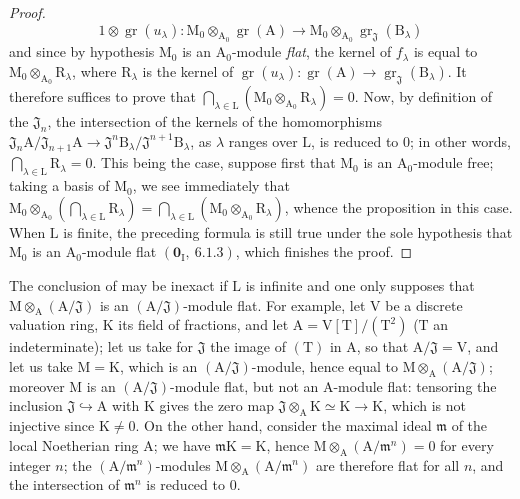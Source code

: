 \begin{proof}
\[
1\otimes\operatorname{gr}(u_\lambda) : \mathrm{M}_0\otimes_{\mathrm{A}_0}\operatorname{gr}(\mathrm{A}) \to \mathrm{M}_0\otimes_{\mathrm{A}_0}\operatorname{gr}_\mathfrak{J}(\mathrm{B}_\lambda)
\]
and since by hypothesis $\mathrm{M}_0$ is an $\mathrm{A}_0$-module \emph{flat}, the kernel of $f_\lambda$ is equal to $\mathrm{M}_0\otimes_{\mathrm{A}_0}\mathrm{R}_\lambda$,
where $\mathrm{R}_\lambda$ is the kernel of $\operatorname{gr}(u_\lambda):\operatorname{gr}(\mathrm{A})\to\operatorname{gr}_\mathfrak{J}(\mathrm{B}_\lambda)$. It therefore suffices to prove that
$\bigcap_{\lambda\in\mathrm{L}}(\mathrm{M}_0\otimes_{\mathrm{A}_0}\mathrm{R}_\lambda)=0$. Now, by definition of the $\mathfrak{J}_n$, the intersection of the kernels of the homomorphisms
$\mathfrak{J}_n\mathrm{A}/\mathfrak{J}_{n+1}\mathrm{A}\to\mathfrak{J}^n\mathrm{B}_\lambda/\mathfrak{J}^{n+1}\mathrm{B}_\lambda$, as $\lambda$ ranges over $\mathrm{L}$, is reduced to $0$; in other
words, $\bigcap_{\lambda\in\mathrm{L}}\mathrm{R}_\lambda=0$. This being the case, suppose first that $\mathrm{M}_0$ is an $\mathrm{A}_0$-module free; taking
a basis of $\mathrm{M}_0$, we see immediately that $\mathrm{M}_0\otimes_{\mathrm{A}_0}(\bigcap_{\lambda\in\mathrm{L}}\mathrm{R}_\lambda)=\bigcap_{\lambda\in\mathrm{L}}(\mathrm{M}_0\otimes_{\mathrm{A}_0}\mathrm{R}_\lambda)$, whence the
proposition in this case. When $\mathrm{L}$ is finite, the preceding formula is still true under
the sole hypothesis that $\mathrm{M}_0$ is an $\mathrm{A}_0$-module flat $(\mathbf{0}_\mathrm{I},~6.1.3)$, which finishes the
proof.
\end{proof}

\begin{remark}[11.4.2]
\label{IV.11.4.2}
The conclusion of  may be inexact if $\mathrm{L}$ is infinite
and one only supposes that $\mathrm{M}\otimes_\mathrm{A}(\mathrm{A}/\mathfrak{J})$ is an $(\mathrm{A}/\mathfrak{J})$-module flat. For example,
let $\mathrm{V}$ be a discrete valuation ring, $\mathrm{K}$ its field of fractions, and let $\mathrm{A}=\mathrm{V}[\mathrm{T}]/(\mathrm{T}^2)$
($\mathrm{T}$ an indeterminate); let us take for $\mathfrak{J}$ the image of $(\mathrm{T})$ in $\mathrm{A}$, so that $\mathrm{A}/\mathfrak{J}=\mathrm{V}$, and
let us take $\mathrm{M}=\mathrm{K}$, which is an $(\mathrm{A}/\mathfrak{J})$-module, hence equal to $\mathrm{M}\otimes_\mathrm{A}(\mathrm{A}/\mathfrak{J})$; moreover $\mathrm{M}$ is
an $(\mathrm{A}/\mathfrak{J})$-module flat, but not an $\mathrm{A}$-module flat: tensoring the inclusion $\mathfrak{J}\hookrightarrow\mathrm{A}$ with $\mathrm{K}$
gives the zero map $\mathfrak{J}\otimes_{\mathrm{A}}\mathrm{K}\simeq\mathrm{K}\longrightarrow\mathrm{K}$,
which is not injective since $\mathrm{K}\neq0$. On the other hand, consider the maximal ideal $\mathfrak{m}$ of the local Noetherian
ring $\mathrm{A}$; we have $\mathfrak{m}\mathrm{K}=\mathrm{K}$, hence $\mathrm{M}\otimes_\mathrm{A}(\mathrm{A}/\mathfrak{m}^n)=0$ for every integer $n$; the $(\mathrm{A}/\mathfrak{m}^n)$-modules
$\mathrm{M}\otimes_\mathrm{A}(\mathrm{A}/\mathfrak{m}^n)$ are therefore flat for all $n$, and the intersection of $\mathfrak{m}^n$ is reduced to $0$.
\end{remark}

